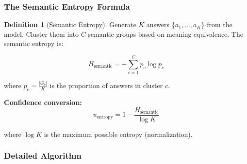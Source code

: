 \documentclass[12pt,a4paper]{article}
\theoremstyle{definition}
\newtheorem{definition}[theorem]{Definition}
\begin{document}
\subsubsection{The Semantic Entropy Formula}

\begin{definition}[Semantic Entropy]
Generate $K$ answers $\{a_1, \ldots, a_K\}$ from the model. Cluster them into $C$ semantic groups based on meaning equivalence. The semantic entropy is:

\begin{equation}
H_{\text{semantic}} = -\sum_{c=1}^C p_c \log p_c
\end{equation}

where $p_c = \frac{|G_c|}{K}$ is the proportion of answers in cluster $c$.
\end{definition}

\textbf{Confidence conversion:}
\begin{equation}
u_{\text{entropy}} = 1 - \frac{H_{\text{semantic}}}{\log K}
\end{equation}

where $\log K$ is the maximum possible entropy (normalization).

\subsubsection{Detailed Algorithm}
\end{document}

